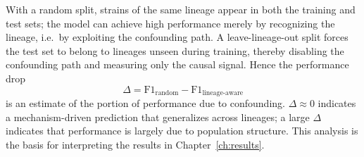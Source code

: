 \documentclass[../main.tex]{subfiles}
\begin{document}
With a random split, strains of the same lineage appear in both the training and test sets; the model can achieve high performance merely by recognizing the lineage, i.e.\ by exploiting the confounding path. A leave-lineage-out split forces the test set to belong to lineages unseen during training, thereby disabling the confounding path and measuring only the causal signal. Hence the performance drop
\begin{equation}
\Delta = \text{F1}_{\text{random}} - \text{F1}_{\text{lineage-aware}}
\end{equation}
is an estimate of the portion of performance due to confounding. $\Delta \approx 0$ indicates a mechanism-driven prediction that generalizes across lineages; a large $\Delta$ indicates that performance is largely due to population structure. This analysis is the basis for interpreting the results in Chapter~\ref{ch:results}.
\end{document}
